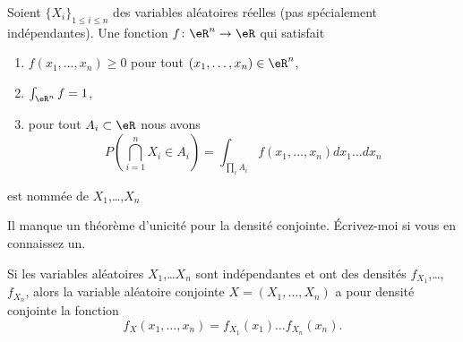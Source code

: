 \begin{definition}      \label{DefFonrepConj}
	Soient \( \{ X_i \}_{1\leq i\leq n}\) des variables aléatoires réelles (pas spécialement indépendantes). Une fonction \( f\colon \eR^n\to \eR\) qui satisfait
	\begin{enumerate}
		\item
		      \( f(x_1,\ldots,x_n)\geq 0\) pour tout \( (x_1,\ldots,x_n)\in\eR^n\),
		\item
		      \( \int_{\eR^n}f=1\),
		\item       \label{ItemDefFonrepConjiii}
		      pour tout \( A_i\subset\eR \) nous avons
		      \begin{equation}
			      P(\bigcap_{i=1}^n X_i\in A_i)=\int_{\prod_i A_i}f(x_1,\ldots,x_n)dx_1\ldots dx_n
		      \end{equation}
	\end{enumerate}
	est nommée  de \( X_1\),\ldots,\( X_n\)
\end{definition}

\begin{probleme}		\label{PROBooPVIXooNLpmIn}
	Il manque un théorème d'unicité pour la densité conjointe. Écrivez-moi si vous en connaissez un.
\end{probleme}

\begin{proposition}     \label{PropDensiteConjIndep}
	Si les variables aléatoires \( X_1\),\ldots \( X_n\) sont indépendantes et ont des densités \( f_{X_1}\),\ldots,\( f_{X_n}\), alors la variable aléatoire conjointe \( X=(X_1,\ldots,X_n)\) a pour densité conjointe la fonction
	\begin{equation}
		f_X(x_1,\ldots,x_n)=f_{X_1}(x_1)\ldots f_{X_n}(x_n).
	\end{equation}
\end{proposition}

